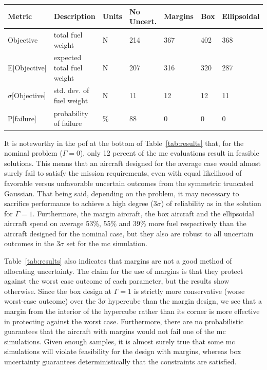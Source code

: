 \begin{table}[!h]
\begin{center}
\begin{tabular}{C{2cm} C{3.8cm} C{1.25cm} C{1.6cm} C{1.6cm} C{1.6cm} C{1.6cm}}
\hline
Metric & Description & Units & No Uncert. & Margins & Box & Ellipsoidal \\
\hline
Objective & total fuel weight & $\mathrm{N}$ & 214 & 367 & 402 & 368 \\
E[Objective] & expected total fuel weight & $\mathrm{N}$ & 207 & 316 & 320 & 287 \\
$\sigma$[Objective] & std. dev. of fuel weight & $\mathrm{N}$ & 11 & 12 & 12 & 11 \\
P[failure] & probability of failure & \% & 88 & 0 & 0 & 0\\
\hline
\end{tabular}
\end{center}
\end{table}

It is noteworthy in the \gls{pof} at the bottom of Table~\ref{tab:results} that,
for the nominal problem ($\Gamma = 0$),
only 12 percent of the \gls{mc} evaluations result in feasible solutions.
This means that an aircraft designed for the average case would almost surely
fail to satisfy the mission requirements, even with equal likelihood of favorable versus
unfavorable uncertain outcomes from the symmetric truncated Gaussian.
That being said, depending on the problem, it may necessary to sacrifice
performance to achieve a high degree ($3\sigma$) of
reliability as in the solution for $\Gamma = 1$. Furthermore, the margin aircraft, the box aircraft
and the ellipsoidal aircraft spend on average 53\%, 55\% and 39\% more fuel respectively
than the aircraft designed for the nominal case, but they also are
robust to all uncertain outcomes in the $3\sigma$ set for the \gls{mc} simulation.

Table~\ref{tab:results} also indicates that margins are not a good method of
allocating uncertainty. The claim for the use of margins is that they protect against
the worst case outcome of each parameter, but the results show otherwise.
Since the box design at $\Gamma=1$ is strictly
more conservative (worse worst-case outcome) over the $3\sigma$ hypercube
than the margin design, we see that a margin from the interior of the hypercube
rather than its corner is more effective in protecting against the worst case.
Furthermore, there are no probabilistic
guarantees that the aircraft
with margins would not fail one of the \gls{mc} simulations. Given enough samples,
it is almost surely true that some \gls{mc} simulations will violate feasibility
for the design with margins,
whereas box uncertainty guarantees deterministically that the constraints are satisfied.


